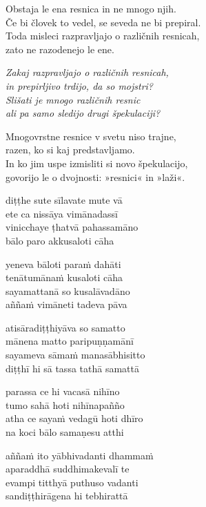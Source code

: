 Obstaja le ena resnica in ne mnogo njih.\\
Če bi človek to vedel, se seveda ne bi prepiral.\\
Toda misleci razpravljajo o različnih resnicah,\\
zato ne razodenejo le ene.

\emph{Zakaj razpravljajo o različnih resnicah,\\
in prepirljivo trdijo, da so mojstri?\\
Slišati je mnogo različnih resnic\\
ali pa samo sledijo drugi špekulaciji?}

Mnogovrstne resnice v svetu niso trajne,\\
razen, ko si kaj predstavljamo.\\
In ko jim uspe izmisliti si novo špekulacijo,\\
govorijo le o dvojnosti: »resnici« in »laži«.


\clearpage

diṭṭhe sute sīlavate mute vā\\
ete ca nissāya vimānadassī\\
vinicchaye ṭhatvā pahassamāno\\
bālo paro akkusaloti cāha

yeneva bāloti paraṁ dahāti\\
tenātumānaṁ kusaloti cāha\\
sayamattanā so kusalāvadāno\\
aññaṁ vimāneti tadeva pāva

atisāradiṭṭhiyāva so samatto\\
mānena matto paripuṇṇamānī\\
sayameva sāmaṁ manasābhisitto\\
diṭṭhī hi sā tassa tathā samattā

parassa ce hi vacasā nihīno\\
tumo sahā hoti nihīnapañño\\
atha ce sayaṁ vedagū hoti dhīro\\
na koci bālo samaṇesu atthi

aññaṁ ito yābhivadanti dhammaṁ\\
aparaddhā suddhimakevalī te\\
evampi titthyā puthuso vadanti\\
sandiṭṭhirāgena hi tebhirattā

